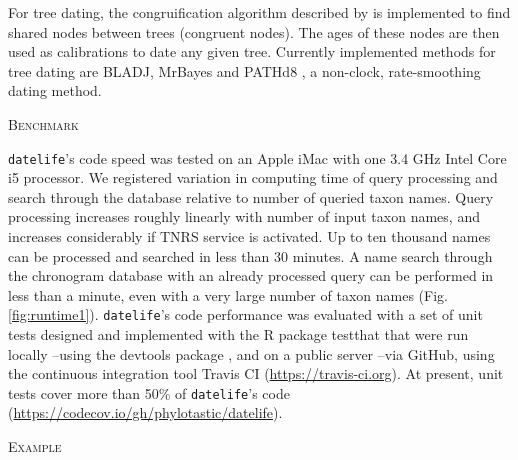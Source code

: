 \documentclass[11pt,]{article}
\begin{document}
For tree dating, the congruification algorithm described by
\citet{Eastman2013} is implemented to find shared nodes between trees
(congruent nodes). The ages of these nodes are then used as calibrations
to date any given tree. Currently implemented methods for tree dating
are BLADJ, MrBayes \citep{Huelsenbeck2001, Ronquist2003} and PATHd8
\citep{Britton2007}, a non-clock, rate-smoothing dating method.

\begin{center}
\textsc{Benchmark}
\end{center}

\texttt{datelife}'s code speed was tested on an Apple iMac with one 3.4
GHz Intel Core i5 processor. We registered variation in computing time
of query processing and search through the database relative to number
of queried taxon names. Query processing increases roughly linearly with
number of input taxon names, and increases considerably if TNRS service
is activated. Up to ten thousand names can be processed and searched in
less than 30 minutes. A name search through the chronogram database with
an already processed query can be performed in less than a minute, even
with a very large number of taxon names (Fig. \ref{fig:runtime1}).
\texttt{datelife}'s code performance was evaluated with a set of unit
tests designed and implemented with the R package testthat
\citep{RCoreTeam2018} that were run locally --using the devtools package
\citep{RCoreTeam2018}, and on a public server --via GitHub, using the
continuous integration tool Travis CI (\url{https://travis-ci.org}). At
present, unit tests cover more than 50\% of \texttt{datelife}'s code
(\url{https://codecov.io/gh/phylotastic/datelife}).

\begin{center}
\textsc{Example}
\end{center}
\end{document}
